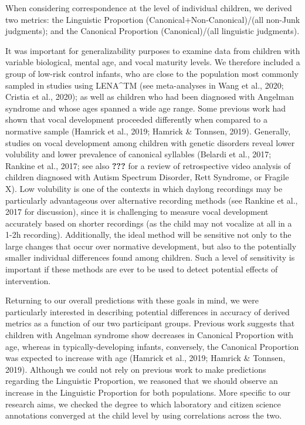 \documentclass[english,,man]{apa6}
\begin{document}
When considering correspondence at the level of individual children, we derived two metrics: the Linguistic Proportion (Canonical+Non-Canonical)/(all non-Junk judgments); and the Canonical Proportion (Canonical)/(all linguistic judgments).

It was important for generalizability purposes to examine data from children with variable biological, mental age, and vocal maturity levels. We therefore included a group of low-risk control infants, who are close to the population most commonly sampled in studies using LENA\^{}TM (see meta-analyses in Wang et al., 2020; Cristia et al., 2020); as well as children who had been diagnosed with Angelman syndrome and whose ages spanned a wide age range. Some previous work had shown that vocal development proceeded differently when compared to a normative sample (Hamrick et al., 2019; Hamrick \& Tonnsen, 2019). Generally, studies on vocal development among children with genetic disorders reveal lower volubility and lower prevalence of canonical syllables (Belardi et al., 2017; Rankine et al., 2017; see also {\textbf{???}} for a review of retrospective video analysis of children diagnosed with Autism Spectrum Disorder, Rett Syndrome, or Fragile X). Low volubility is one of the contexts in which daylong recordings may be particularly advantageous over alternative recording methods (see Rankine et al., 2017 for discussion), since it is challenging to measure vocal development accurately based on shorter recordings (as the child may not vocalize at all in a 1-2h recording). Additionally, the ideal method will be sensitive not only to the large changes that occur over normative development, but also to the potentially smaller individual differences found among children. Such a level of sensitivity is important if these methods are ever to be used to detect potential effects of intervention.

Returning to our overall predictions with these goals in mind, we were particularly interested in describing potential differences in accuracy of derived metrics as a function of our two participant groups. Previous work suggests that children with Angelman syndrome show decreases in Canonical Proportion with age, whereas in typically-developing infants, conversely, the Canonical Proportion was expected to increase with age (Hamrick et al., 2019; Hamrick \& Tonnsen, 2019). Although we could not rely on previous work to make predictions regarding the Linguistic Proportion, we reasoned that we should observe an increase in the Linguistic Proportion for both populations. More specific to our research aims, we checked the degree to which laboratory and citizen science annotations converged at the child level by using correlations across the two.
\end{document}
